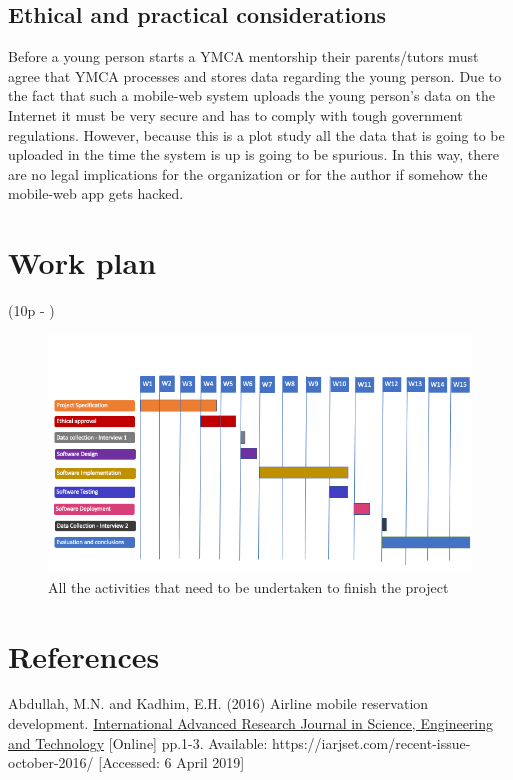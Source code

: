 \documentclass[version=last,fontsize=13pt]{scrartcl}
\begin{document}
\subsection{Ethical and practical considerations}
	Before a young person starts a YMCA mentorship their parents/tutors must agree that YMCA processes and stores data regarding the young person. Due to the fact that such a mobile-web system uploads the young person's data on the Internet it must be very secure and has to comply with tough government regulations. However, because this is a plot study all the data that is going to be uploaded in the time the system is up is going to be spurious. In this way, there are no legal implications for the organization or for the author if somehow the mobile-web app gets hacked. 

\pagebreak
\section{Work plan}(10p - )\\
\blindtext

	\begin{figure}[H]

		\includegraphics[scale = 0.5]{./imgs/ganttChart}
		\caption{All the activities that need to be undertaken to finish the project}
		\label{gC}

	\end{figure}

\pagebreak


\section*{References}
Abdullah, M.N. and Kadhim, E.H. (2016) Airline mobile reservation development.  \underline{International Advanced Research Journal in Science, Engineering and Technology} [Online]  pp.1-3. Available: https://iarjset.com/recent-issue-october-2016/ [Accessed: 6 April 2019]\\
\end{document}

